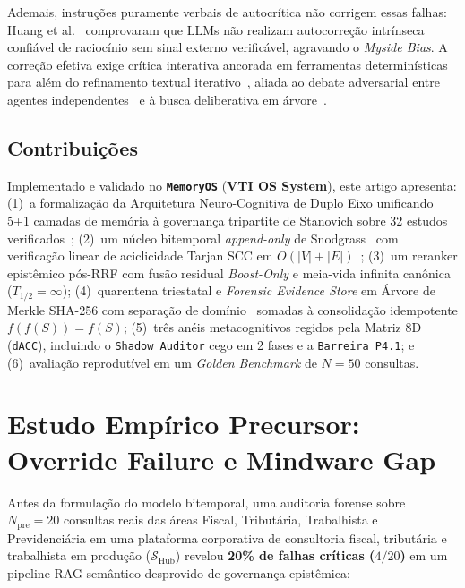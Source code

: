\documentclass[10pt,twocolumn]{article}
\begin{document}
Ademais, instru\c{c}\~oes puramente verbais de autocr\'itica n\~ao corrigem essas falhas: Huang et al.~\cite{E28} comprovaram que LLMs n\~ao realizam autocorre\c{c}\~ao intr\'inseca confi\'avel de racioc\'inio sem sinal externo verific\'avel, agravando o \emph{Myside Bias}. A corre\c{c}\~ao efetiva exige cr\'itica interativa ancorada em ferramentas determin\'isticas~\cite{E29} para al\'em do refinamento textual iterativo~\cite{E30}, aliada ao debate adversarial entre agentes independentes~\cite{E31} e \`a busca deliberativa em \'arvore~\cite{E32}.

\subsection{Contribui\c{c}\~oes}
Implementado e validado no \textbf{\texttt{MemoryOS}} (\textbf{VTI OS System}), este artigo apresenta: (1)~a formaliza\c{c}\~ao da Arquitetura Neuro-Cognitiva de Duplo Eixo unificando 5+1 camadas de mem\'oria \`a governan\c{c}a tripartite de Stanovich sobre 32 estudos verificados~\cite{E01,E21}; (2)~um n\'ucleo bitemporal \emph{append-only} de Snodgrass~\cite{E12} com verifica\c{c}\~ao linear de aciclicidade Tarjan SCC em $O(|V|+|E|)$~\cite{E13}; (3)~um reranker epist\^emico p\'os-RRF com fus\~ao residual \emph{Boost-Only} e meia-vida infinita can\^onica ($T_{1/2}=\infty$); (4)~quarentena triestatal e \emph{Forensic Evidence Store} em \'Arvore de Merkle SHA-256 com separa\c{c}\~ao de dom\'inio~\cite{E19} somadas \`a consolida\c{c}\~ao idempotente $f(f(S))=f(S)$; (5)~tr\^es an\'eis metacognitivos regidos pela Matriz 8D (\texttt{dACC}), incluindo o \texttt{Shadow Auditor} cego em 2 fases e a \texttt{Barreira P4.1}; e (6)~avalia\c{c}\~ao reprodut\'ivel em um \emph{Golden Benchmark} de $N=50$ consultas.

\section{Estudo Emp\'irico Precursor: Override Failure e Mindware Gap}

Antes da formula\c{c}\~ao do modelo bitemporal, uma auditoria forense sobre $N_{\mathrm{pre}} = 20$ consultas reais das \'areas Fiscal, Tribut\'aria, Trabalhista e Previdenci\'aria em uma plataforma corporativa de consultoria fiscal, tribut\'aria e trabalhista em produ\c{c}\~ao ($\mathcal{S}_{\mathrm{Hub}}$) revelou \textbf{20\% de falhas cr\'iticas ($4/20$)} em um pipeline RAG sem\^antico desprovido de governan\c{c}a epist\^emica:
\end{document}

